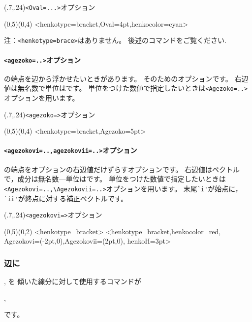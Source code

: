 \begin{showEx}(.7,.24){\texttt{<Oval=...>}オプション}
\begin{zahyou*}[ul=6mm](0,5)(0,4)
  \Hasen{\A\B}
  \HenKo<henkotype=bracket,Oval=4pt,henkocolor=cyan>
    \A{}
\end{zahyou*}
\end{showEx}

注：\verb+<henkotype=brace>+はありません。
後述のコマンドをご覧ください.

\paragraph{\texttt{<agezoko=..>}オプション}
の端点を辺から浮かせたいときがあります。
そのためのオプションです。
右辺値は無名数で単位はです。
単位をつけた数値で指定したいときは\verb+<Agezoko=..>+オプションを用います。

\begin{showEx}(.7,.24){\texttt{<agezoko=>}オプション}
\begin{zahyou*}[ul=6mm](0,5)(0,4)
  \Hasen{\A\B}
  \HenKo<henkotype=bracket,Agezoko=5pt>\A{}
\end{zahyou*}
\end{showEx}

\paragraph{\texttt{<agezokovi=..,agezokovii=..>}オプション}
の端点をオプションの右辺値だけずらすオプションです。
右辺値はベクトルで，成分は無名数---単位はです。
単位をつけた数値で指定したいときは\verb+<Agezokovi=..,\Agezokovii=..>+オプションを用います。
末尾\verb+`i'+が始点に，\verb+`ii'+が終点に対する補正ベクトルです。

\begin{showEx}(.7,.24){\texttt{<agezokovi=>}オプション}
\begin{zahyou*}[ul=6mm](0,5)(0,2)
  \Hasen{\A\B}
  \HenKo<henkotype=bracket>\A\B{}
  \HenKo<henkotype=bracket,henkocolor=red,%
    Agezokovi={(-2pt,0)},Agezokovii={(2pt,0)},%
    henkoH=3pt>\A\B{}
\end{zahyou*}
\end{showEx}


\subsubsection{辺に\texorpdfstring{}{brace}}
, を
傾いた線分に対して使用するコマンドが
\begin{jquote}
  , 
\end{jquote}
です。

